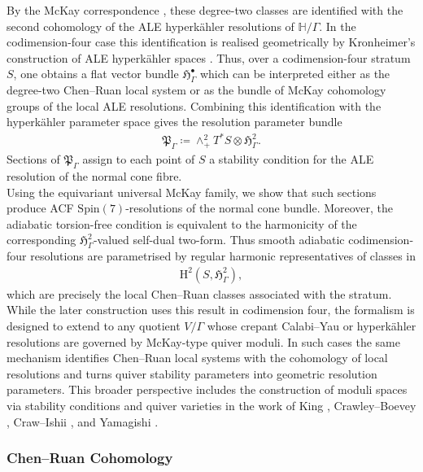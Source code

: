 \documentclass[psamsfonts]{amsart}
\theoremstyle{plain}
\theoremstyle{definition}{
\newtheorem{defi}{Definition}[section]
\newtheorem{ass}{Assumption}
\newtheorem*{nota}{Notation}}
\theoremstyle{remark}{
\newtheorem{rem}{Remark}
\newtheorem{ex}{Example}}
\theoremstyle{plain}{
\newtheorem{thm}{Theorem}[section]
\newtheorem{lem}{Lemma}[section]
\newtheorem{cor}{Corollary}[section]
\newtheorem{prop}{Proposition}[section]
\newtheorem{con}{Conjecture}[section]}
\newcommand{\m}[1]{{\mathrm{#1}}}
\begin{document}
By the McKay correspondence \cite{mckay1980graphs,reid2002mckay}, these degree-two classes are identified with the second cohomology of the ALE hyperkähler resolutions of $\mathbb{H}/\Gamma$. In the codimension-four case this identification is realised geometrically by Kronheimer's construction of ALE hyperkähler spaces \cite{kronheimer1989construction,kronheimer}. Thus,
over a codimension-four stratum $S$, one obtains a flat vector bundle $\mathfrak{H}^\bullet_\Gamma$ which can be interpreted either as the degree-two Chen--Ruan local system or as the bundle of McKay cohomology groups of the local ALE resolutions. Combining this identification with the hyperkähler parameter space gives the resolution
parameter bundle
\begin{align*}
    \mathfrak{P}_\Gamma\coloneqq \wedge^2_+T^*S\otimes \mathfrak{H}^2_\Gamma .
\end{align*}
Sections of $\mathfrak{P}_\Gamma$ assign to each point of $S$ a stability condition for the ALE resolution of the normal cone fibre.\\

Using the equivariant universal McKay family, we show that such sections produce ACF $\m{Spin}(7)$-resolutions of the normal cone bundle. Moreover, the adiabatic torsion-free condition is equivalent to the harmonicity of the corresponding $\mathfrak{H}^2_\Gamma$-valued self-dual two-form. Thus smooth adiabatic codimension-four resolutions are parametrised by regular harmonic representatives of classes in
\begin{align*}
\m{H}^2(S,\mathfrak{H}^2_\Gamma),
\end{align*}
which are precisely the local Chen--Ruan classes associated with the stratum.\\

While the later construction uses this result in codimension four, the formalism is designed to extend to any quotient $V/\Gamma$ whose crepant Calabi--Yau or hyperkähler resolutions are governed by McKay-type quiver moduli. In such cases the same mechanism identifies Chen--Ruan local systems with the cohomology of local resolutions and turns quiver stability parameters into geometric resolution parameters. This broader perspective includes the construction of moduli spaces via stability conditions and quiver varieties in the work of King \cite{king1994moduli}, Crawley--Boevey
\cite{crawley2001geometry}, Craw--Ishii \cite{craw2004flops}, and Yamagishi \cite{yamagishi2025moduliI,yamagishi2025moduliII}.


\subsubsection{Chen--Ruan Cohomology}
\label{Chen--Ruan-Cohomology}
\end{document}
